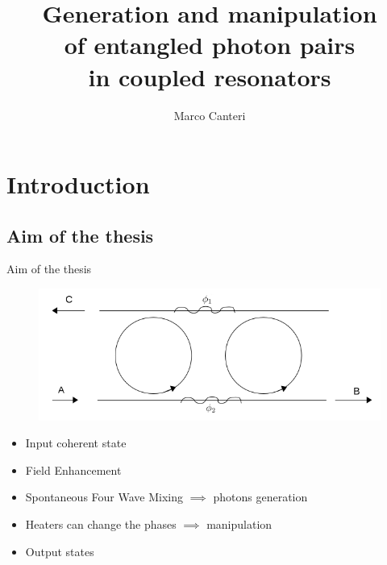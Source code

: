 \documentclass{beamer}
\title[This is my Title]{Generation and manipulation\\ of entangled photon pairs \\ in coupled resonators}
\author[Marco Canteri]{Marco Canteri}
\begin{document}
    \typesetFrontSlides


\section{Introduction}
\subsection{Aim of the thesis}
\begin{frame}[plain]{Aim of the thesis}
\begin{figure}
\centering
\includegraphics[width =.8\textwidth]{structure}
\end{figure}
\begin{itemize}
\item Input coherent state
\item Field Enhancement
\item Spontaneous Four Wave Mixing $\implies$ photons generation
\item Heaters can change the phases $\implies$ manipulation
\item Output states

\end{itemize}
\end{frame}
\end{document}

